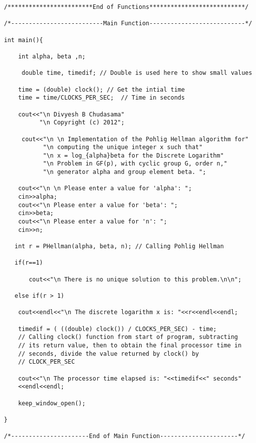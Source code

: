 \documentclass[iwp,first]{luthesis}
\begin{document}
\begin{verbatim}
/************************End of Functions***************************/

/*--------------------------Main Function---------------------------*/

int main(){
    
    int alpha, beta ,n;
    
     double time, timedif; // Double is used here to show small values

    time = (double) clock(); // Get the intial time
    time = time/CLOCKS_PER_SEC;  // Time in seconds 
    
    cout<<"\n Divyesh B Chudasama"
          "\n Copyright (c) 2012";
          
     cout<<"\n \n Implementation of the Pohlig Hellman algorithm for" 
           "\n computing the unique integer x such that" 
           "\n x = log_{alpha}beta for the Discrete Logarithm" 
           "\n Problem in GF(p), with cyclic group G, order n," 
           "\n generator alpha and group element beta. ";
          
    cout<<"\n \n Please enter a value for 'alpha': ";
    cin>>alpha;
    cout<<"\n Please enter a value for 'beta': ";
    cin>>beta;
    cout<<"\n Please enter a value for 'n': ";
    cin>>n;
   
   int r = PHellman(alpha, beta, n); // Calling Pohlig Hellman
   
   if(r==1)
            
       cout<<"\n There is no unique solution to this problem.\n\n";
   
   else if(r > 1)
    
    cout<<endl<<"\n The discrete logarithm x is: "<<r<<endl<<endl;
    
    timedif = ( ((double) clock()) / CLOCKS_PER_SEC) - time; 
    // Calling clock() function from start of program, subtracting 
    // its return value, then to obtain the final processor time in 
    // seconds, divide the value returned by clock() by 
    // CLOCK_PER_SEC
    
    cout<<"\n The processor time elapsed is: "<<timedif<<" seconds"
    <<endl<<endl;
    
    keep_window_open();
       
}

/*----------------------End of Main Function----------------------*/


\end{verbatim}
\end{document}
